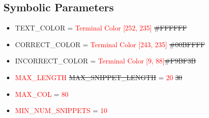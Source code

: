 \documentclass[12pt, titlepage]{article}
\begin{document}
\subsection{Symbolic Parameters}

\begin{itemize}
    \item TEXT\_COLOR = \textcolor{red}{Terminal Color [252, 235]} \sout{\#FFFFFF}
    \item CORRECT\_COLOR = \textcolor{red}{Terminal Color [243, 235]} \sout{\#00BFFFF}
    \item INCORRECT\_COLOR = \textcolor{red}{Terminal Color [9, 88]}\sout{\#F9BF3B}
    \item \textcolor{red}{MAX\_LENGTH} \sout{MAX\_SNIPPET\_LENGTH} = \textcolor{red}{20} \sout{30}
    \item \textcolor{red}{MAX\_COL} = \textcolor{red}{80}
    \item \textcolor{red}{MIN\_NUM\_SNIPPETS} = \textcolor{red}{10}
\end{itemize}
\end{document}

